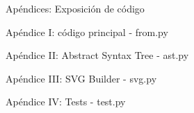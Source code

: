 \begin{section}{Ap\'endices: Exposici\'on de c\'odigo}

\begin{subsection}{Ap\'endice I: c\'odigo principal - from.py}

	

\end{subsection}

\begin{subsection}{Ap\'endice II: Abstract Syntax Tree - ast.py}

	

\end{subsection}

\begin{subsection}{Ap\'endice III: SVG Builder - svg.py}

	

\end{subsection}

\begin{subsection}{Ap\'endice IV: Tests - test.py}

	

\end{subsection}

\end{section}